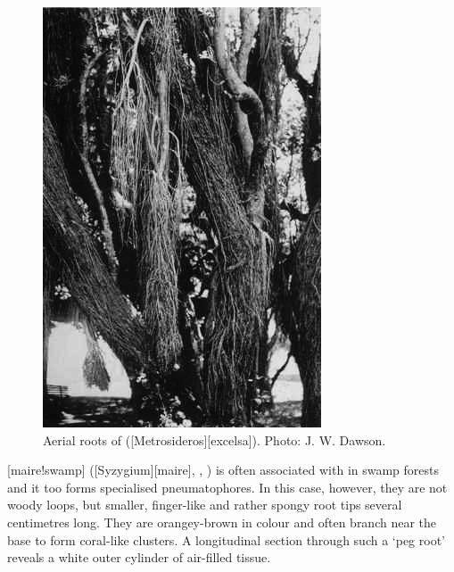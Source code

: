 \begin{figure}[t]
\begin{minipage}[t]{\textwidth}
		\begin{minipage}[t]{(\textwidth-\fgap-\fgap) * \real{0.354}}
			\centering
			\includegraphics[width=\textwidth]{graphics/figure15pohutakawa.jpg}
			\caption[Aerial roots of pohutukawa]{Aerial roots of  ([Metrosideros][excelsa]).
			Photo:  J. W. Dawson.}%
			\label{fig:15pohutakawa}
		\end{minipage}
	\end{minipage}
\end{figure}

[maire!swamp] ([Syzygium][maire], , ) is often associated with  in swamp forests and it too forms specialised pneumatophores.
In this case, however, they are not woody loops, but smaller, finger-like and rather spongy root tips several centimetres long.
They are orangey-brown in colour and often branch near the base to form coral-like clusters.
A longitudinal section through such a `peg root' reveals a white outer cylinder of air-filled tissue.

